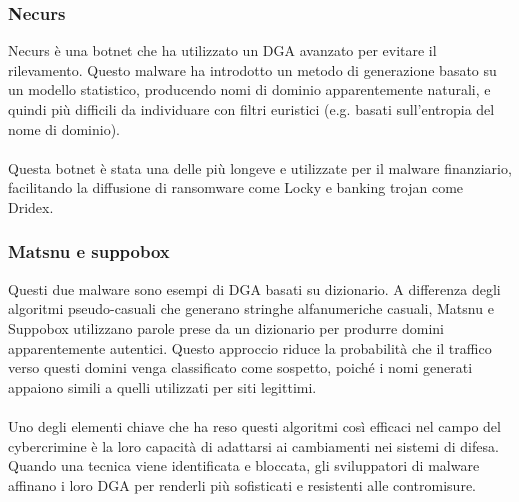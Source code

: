\subsubsection*{Necurs}
Necurs è una botnet che ha utilizzato un DGA avanzato per 
evitare il rilevamento. Questo malware ha introdotto un metodo di 
generazione basato su un modello statistico, producendo nomi di 
dominio apparentemente naturali, e quindi più difficili da individuare 
con filtri euristici (e.g. basati sull'entropia del nome di dominio). 
\\\\
Questa botnet è stata una delle più longeve e utilizzate per il malware 
finanziario, facilitando la diffusione di ransomware come Locky e 
banking trojan come Dridex.

\subsubsection*{Matsnu e suppobox}
Questi due malware sono esempi di DGA basati su dizionario. 
A differenza degli algoritmi pseudo-casuali che generano stringhe 
alfanumeriche casuali, Matsnu e Suppobox utilizzano 
parole prese da un dizionario per produrre domini apparentemente autentici. 
Questo approccio riduce la probabilità che il traffico 
verso questi domini venga classificato come sospetto, poiché i nomi 
generati appaiono simili a quelli utilizzati per siti legittimi.
\\\\
Uno degli elementi chiave che ha reso questi algoritmi così 
efficaci nel campo del cybercrimine è la loro capacità di 
adattarsi ai cambiamenti nei sistemi di difesa. 
Quando una tecnica viene identificata e bloccata, gli sviluppatori 
di malware affinano i loro DGA per renderli più sofisticati e 
resistenti alle contromisure.